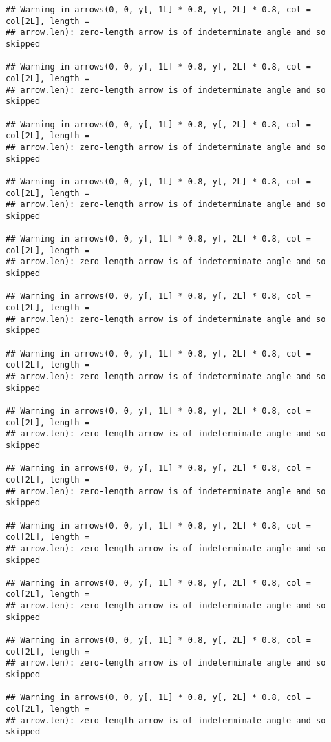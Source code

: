 \documentclass[
]{article}
\begin{document}
\begin{verbatim}
## Warning in arrows(0, 0, y[, 1L] * 0.8, y[, 2L] * 0.8, col = col[2L], length =
## arrow.len): zero-length arrow is of indeterminate angle and so skipped

## Warning in arrows(0, 0, y[, 1L] * 0.8, y[, 2L] * 0.8, col = col[2L], length =
## arrow.len): zero-length arrow is of indeterminate angle and so skipped

## Warning in arrows(0, 0, y[, 1L] * 0.8, y[, 2L] * 0.8, col = col[2L], length =
## arrow.len): zero-length arrow is of indeterminate angle and so skipped

## Warning in arrows(0, 0, y[, 1L] * 0.8, y[, 2L] * 0.8, col = col[2L], length =
## arrow.len): zero-length arrow is of indeterminate angle and so skipped

## Warning in arrows(0, 0, y[, 1L] * 0.8, y[, 2L] * 0.8, col = col[2L], length =
## arrow.len): zero-length arrow is of indeterminate angle and so skipped

## Warning in arrows(0, 0, y[, 1L] * 0.8, y[, 2L] * 0.8, col = col[2L], length =
## arrow.len): zero-length arrow is of indeterminate angle and so skipped

## Warning in arrows(0, 0, y[, 1L] * 0.8, y[, 2L] * 0.8, col = col[2L], length =
## arrow.len): zero-length arrow is of indeterminate angle and so skipped

## Warning in arrows(0, 0, y[, 1L] * 0.8, y[, 2L] * 0.8, col = col[2L], length =
## arrow.len): zero-length arrow is of indeterminate angle and so skipped

## Warning in arrows(0, 0, y[, 1L] * 0.8, y[, 2L] * 0.8, col = col[2L], length =
## arrow.len): zero-length arrow is of indeterminate angle and so skipped

## Warning in arrows(0, 0, y[, 1L] * 0.8, y[, 2L] * 0.8, col = col[2L], length =
## arrow.len): zero-length arrow is of indeterminate angle and so skipped

## Warning in arrows(0, 0, y[, 1L] * 0.8, y[, 2L] * 0.8, col = col[2L], length =
## arrow.len): zero-length arrow is of indeterminate angle and so skipped

## Warning in arrows(0, 0, y[, 1L] * 0.8, y[, 2L] * 0.8, col = col[2L], length =
## arrow.len): zero-length arrow is of indeterminate angle and so skipped

## Warning in arrows(0, 0, y[, 1L] * 0.8, y[, 2L] * 0.8, col = col[2L], length =
## arrow.len): zero-length arrow is of indeterminate angle and so skipped


\end{verbatim}
\end{document}
